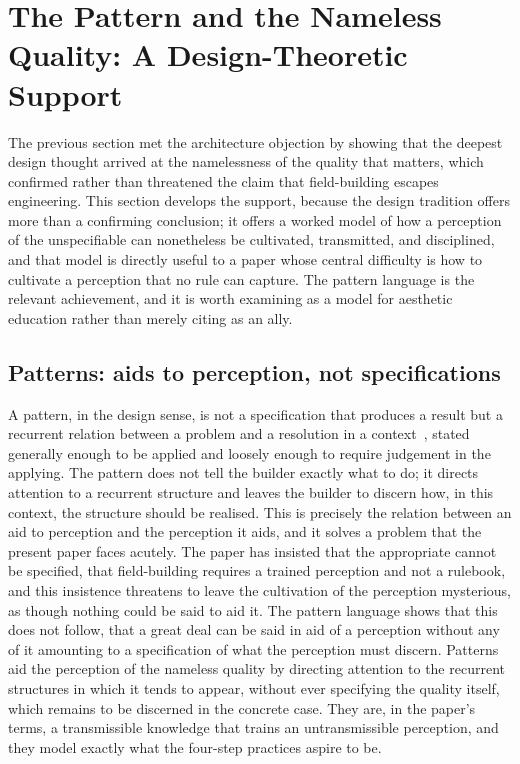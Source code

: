\section{The Pattern and the Nameless Quality: A Design-Theoretic Support}
\label{p22:sec:alexander}

\noindent
The previous section met the architecture objection by showing that the deepest design thought arrived at the namelessness of the quality that matters, which confirmed rather than threatened the claim that field-building escapes engineering. This section develops the support, because the design tradition offers more than a confirming conclusion; it offers a worked model of how a perception of the unspecifiable can nonetheless be cultivated, transmitted, and disciplined, and that model is directly useful to a paper whose central difficulty is how to cultivate a perception that no rule can capture. The pattern language is the relevant achievement, and it is worth examining as a model for aesthetic education rather than merely citing as an ally.

\subsection{Patterns: aids to perception, not specifications}
\label{p22:sub:alex-patterns}

A pattern, in the design sense, is not a specification that produces a result but a recurrent relation between a problem and a resolution in a context~\parencite{alexander_pattern}, stated generally enough to be applied and loosely enough to require judgement in the applying. The pattern does not tell the builder exactly what to do; it directs attention to a recurrent structure and leaves the builder to discern how, in this context, the structure should be realised. This is precisely the relation between an aid to perception and the perception it aids, and it solves a problem that the present paper faces acutely. The paper has insisted that the appropriate cannot be specified, that field-building requires a trained perception and not a rulebook, and this insistence threatens to leave the cultivation of the perception mysterious, as though nothing could be said to aid it. The pattern language shows that this does not follow, that a great deal can be said in aid of a perception without any of it amounting to a specification of what the perception must discern. Patterns aid the perception of the nameless quality by directing attention to the recurrent structures in which it tends to appear, without ever specifying the quality itself, which remains to be discerned in the concrete case. They are, in the paper's terms, a transmissible knowledge that trains an untransmissible perception, and they model exactly what the four-step practices aspire to be.

